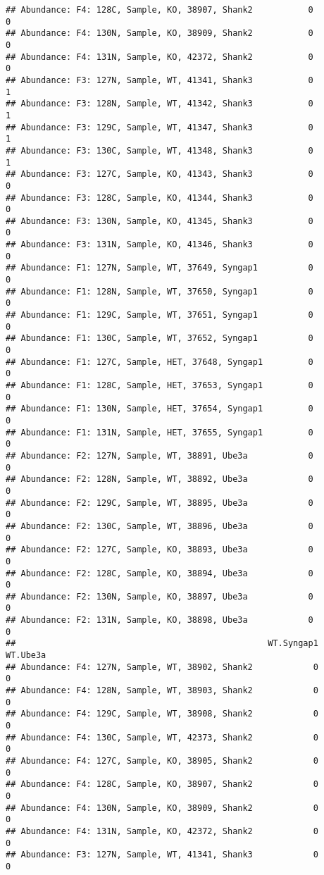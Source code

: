 \documentclass[]{article}
\begin{document}
\begin{verbatim}
## Abundance: F4: 128C, Sample, KO, 38907, Shank2           0         0
## Abundance: F4: 130N, Sample, KO, 38909, Shank2           0         0
## Abundance: F4: 131N, Sample, KO, 42372, Shank2           0         0
## Abundance: F3: 127N, Sample, WT, 41341, Shank3           0         1
## Abundance: F3: 128N, Sample, WT, 41342, Shank3           0         1
## Abundance: F3: 129C, Sample, WT, 41347, Shank3           0         1
## Abundance: F3: 130C, Sample, WT, 41348, Shank3           0         1
## Abundance: F3: 127C, Sample, KO, 41343, Shank3           0         0
## Abundance: F3: 128C, Sample, KO, 41344, Shank3           0         0
## Abundance: F3: 130N, Sample, KO, 41345, Shank3           0         0
## Abundance: F3: 131N, Sample, KO, 41346, Shank3           0         0
## Abundance: F1: 127N, Sample, WT, 37649, Syngap1          0         0
## Abundance: F1: 128N, Sample, WT, 37650, Syngap1          0         0
## Abundance: F1: 129C, Sample, WT, 37651, Syngap1          0         0
## Abundance: F1: 130C, Sample, WT, 37652, Syngap1          0         0
## Abundance: F1: 127C, Sample, HET, 37648, Syngap1         0         0
## Abundance: F1: 128C, Sample, HET, 37653, Syngap1         0         0
## Abundance: F1: 130N, Sample, HET, 37654, Syngap1         0         0
## Abundance: F1: 131N, Sample, HET, 37655, Syngap1         0         0
## Abundance: F2: 127N, Sample, WT, 38891, Ube3a            0         0
## Abundance: F2: 128N, Sample, WT, 38892, Ube3a            0         0
## Abundance: F2: 129C, Sample, WT, 38895, Ube3a            0         0
## Abundance: F2: 130C, Sample, WT, 38896, Ube3a            0         0
## Abundance: F2: 127C, Sample, KO, 38893, Ube3a            0         0
## Abundance: F2: 128C, Sample, KO, 38894, Ube3a            0         0
## Abundance: F2: 130N, Sample, KO, 38897, Ube3a            0         0
## Abundance: F2: 131N, Sample, KO, 38898, Ube3a            0         0
##                                                  WT.Syngap1 WT.Ube3a
## Abundance: F4: 127N, Sample, WT, 38902, Shank2            0        0
## Abundance: F4: 128N, Sample, WT, 38903, Shank2            0        0
## Abundance: F4: 129C, Sample, WT, 38908, Shank2            0        0
## Abundance: F4: 130C, Sample, WT, 42373, Shank2            0        0
## Abundance: F4: 127C, Sample, KO, 38905, Shank2            0        0
## Abundance: F4: 128C, Sample, KO, 38907, Shank2            0        0
## Abundance: F4: 130N, Sample, KO, 38909, Shank2            0        0
## Abundance: F4: 131N, Sample, KO, 42372, Shank2            0        0
## Abundance: F3: 127N, Sample, WT, 41341, Shank3            0        0

\end{verbatim}
\end{document}
